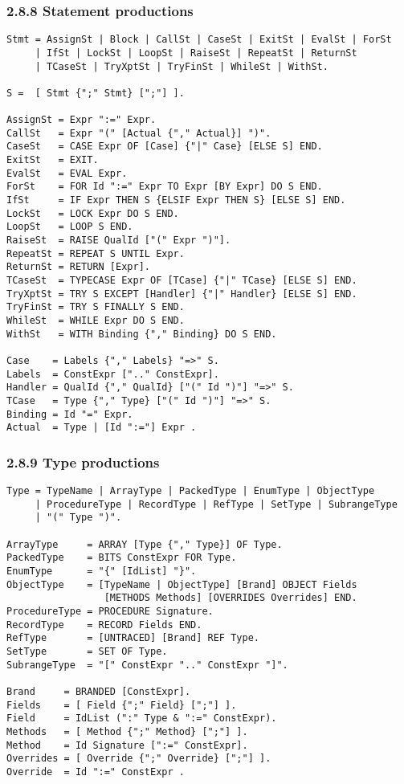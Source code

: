 \documentclass[10pt]{article}
\begin{document}
\subsubsection*{2.8.8 Statement productions}

\begin{verbatim}
Stmt = AssignSt | Block | CallSt | CaseSt | ExitSt | EvalSt | ForSt
     | IfSt | LockSt | LoopSt | RaiseSt | RepeatSt | ReturnSt
     | TCaseSt | TryXptSt | TryFinSt | WhileSt | WithSt.

S =  [ Stmt {";" Stmt} [";"] ].

AssignSt = Expr ":=" Expr.
CallSt   = Expr "(" [Actual {"," Actual}] ")".
CaseSt   = CASE Expr OF [Case] {"|" Case} [ELSE S] END.
ExitSt   = EXIT.
EvalSt   = EVAL Expr.
ForSt    = FOR Id ":=" Expr TO Expr [BY Expr] DO S END.
IfSt     = IF Expr THEN S {ELSIF Expr THEN S} [ELSE S] END.
LockSt   = LOCK Expr DO S END.
LoopSt   = LOOP S END.
RaiseSt  = RAISE QualId ["(" Expr ")"].
RepeatSt = REPEAT S UNTIL Expr.
ReturnSt = RETURN [Expr].
TCaseSt  = TYPECASE Expr OF [TCase] {"|" TCase} [ELSE S] END.
TryXptSt = TRY S EXCEPT [Handler] {"|" Handler} [ELSE S] END.
TryFinSt = TRY S FINALLY S END.
WhileSt  = WHILE Expr DO S END.
WithSt   = WITH Binding {"," Binding} DO S END.

Case    = Labels {"," Labels} "=>" S.
Labels  = ConstExpr [".." ConstExpr].
Handler = QualId {"," QualId} ["(" Id ")"] "=>" S.
TCase   = Type {"," Type} ["(" Id ")"] "=>" S.
Binding = Id "=" Expr.
Actual  = Type | [Id ":="] Expr .
\end{verbatim}

\subsubsection*{2.8.9 Type productions}

\begin{verbatim}
Type = TypeName | ArrayType | PackedType | EnumType | ObjectType
     | ProcedureType | RecordType | RefType | SetType | SubrangeType
     | "(" Type ")".

ArrayType     = ARRAY [Type {"," Type}] OF Type.
PackedType    = BITS ConstExpr FOR Type.
EnumType      = "{" [IdList] "}".
ObjectType    = [TypeName | ObjectType] [Brand] OBJECT Fields
                 [METHODS Methods] [OVERRIDES Overrides] END.
ProcedureType = PROCEDURE Signature.
RecordType    = RECORD Fields END.
RefType       = [UNTRACED] [Brand] REF Type.
SetType       = SET OF Type.
SubrangeType  = "[" ConstExpr ".." ConstExpr "]".

Brand     = BRANDED [ConstExpr].
Fields    = [ Field {";" Field} [";"] ].
Field     = IdList (":" Type & ":=" ConstExpr).
Methods   = [ Method {";" Method} [";"] ].
Method    = Id Signature [":=" ConstExpr].
Overrides = [ Override {";" Override} [";"] ].
Override  = Id ":=" ConstExpr .
\end{verbatim}
\end{document}
